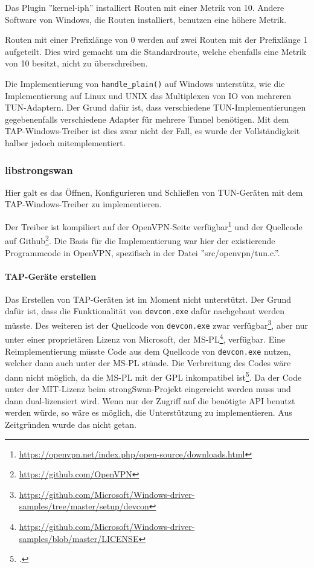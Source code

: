 {Das Plugin ''kernel-iph'' installiert Routen mit einer Metrik von 10.
Andere Software von Windows, die Routen installiert, benutzen eine höhere Metrik.

Routen mit einer Prefixlänge von 0 werden auf zwei Routen mit der Prefixlänge 1 aufgeteilt.
Dies wird gemacht um die Standardroute, welche ebenfalls eine Metrik von 10 besitzt,
nicht zu überschreiben.

Die Implementierung von \texttt{handle\_plain()} auf Windows unterstütz, wie die Implementierung
auf Linux und UNIX das Multiplexen von IO von mehreren TUN-Adaptern. Der Grund dafür ist,
dass verschiedene TUN-Implementierungen gegebenenfalls verschiedene Adapter für mehrere Tunnel
benötigen. Mit dem TAP-Windows-Treiber ist dies zwar nicht der Fall, es wurde der Vollständigkeit
halber jedoch mitemplementiert.

\subsubsection{libstrongswan}
Hier galt es das Öffnen, Konfigurieren und Schließen von TUN-Geräten
mit dem TAP-Windows-Treiber zu implementieren.

Der Treiber ist kompiliert auf der OpenVPN-Seite
verfügbar\footnote{\url{https://openvpn.net/index.php/open-source/downloads.html}}
und der Quellcode auf Github\footnote{\url{https://github.com/OpenVPN}}.
Die Basis für die Implementierung war hier der existierende Programmcode in
OpenVPN, spezifisch in  der Datei ''src/openvpn/tun.c.''.

\paragraph{TAP-Geräte erstellen}
Das Erstellen von TAP-Geräten ist im Moment nicht unterstützt. Der Grund dafür ist,
dass die Funktionalität von \texttt{devcon.exe} dafür nachgebaut werden müsste.
Des weiteren ist der Quellcode von \texttt{devcon.exe} zwar verfügbar\footnote{\url{https://github.com/Microsoft/Windows-driver-samples/tree/master/setup/devcon}},
aber nur unter einer proprietären Lizenz von Microsoft, der MS-PL\footnote{\url{https://github.com/Microsoft/Windows-driver-samples/blob/master/LICENSE}},
verfügbar. Eine Reimplementierung müsste Code aus dem Quellcode von \texttt{devcon.exe} nutzen,
welcher dann auch unter der MS-PL stünde. Die Verbreitung des Codes wäre dann nicht möglich,
da die MS-PL mit der GPL inkompatibel ist\footcite[][]{_gnu.org_2016}.
Da der Code unter der MIT-Lizenz beim strongSwan-Projekt eingereicht werden muss
und dann dual-lizensiert wird.
Wenn nur der Zugriff auf die benötigte API benutzt werden würde, so wäre es möglich,
die Unterstützung zu implementieren. Aus Zeitgründen wurde das nicht getan.

}
